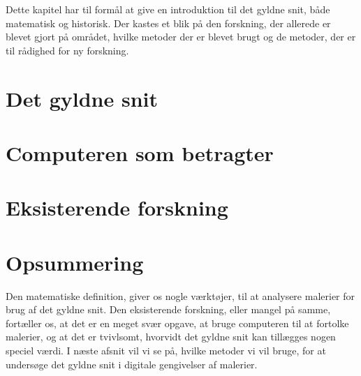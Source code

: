 {
\textsf{
Dette kapitel har til formål at give en introduktion til det gyldne snit,
både matematisk og historisk. Der kastes et blik på den forskning, der
allerede er blevet gjort på området, hvilke metoder der er blevet brugt
og de metoder, der er til rådighed for ny forskning.
}

\section{Det gyldne snit\label{section_gyldne_snit}}


\section{Computeren som betragter\label{section_computer_betragter}}


\section{Eksisterende forskning\label{section_forskning}}


\section*{Opsummering}
Den matematiske definition, giver os nogle værktøjer, til at analysere
malerier for brug af det gyldne snit.  Den eksisterende forskning, eller
mangel på samme, fortæller os, at det er en meget svær opgave, at bruge
computeren til at fortolke malerier, og at det er tvivlsomt, hvorvidt
det gyldne snit kan tillægges nogen speciel værdi.  I næste afsnit vil
vi se på, hvilke metoder vi vil bruge, for at undersøge det gyldne snit
i digitale gengivelser af malerier.

}

